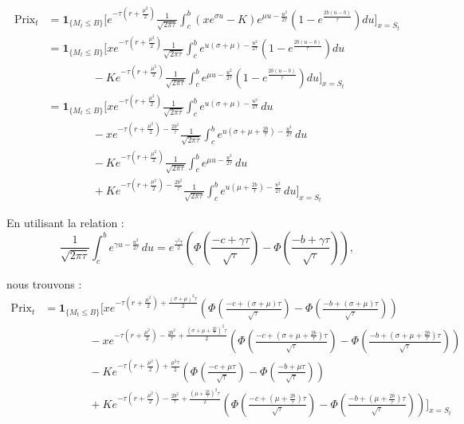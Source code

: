 \documentclass[11pt]{article}
\begin{document}
\begin{align*}
\text{Prix}_t &= \mathbf{1}_{\{M_t \le B\}} \Bigg[ e^{-\tau(r+\frac{\mu^2}{2})} \frac{1}{\sqrt{2\pi\tau}} \int_c^b (x e^{\sigma u} - K) e^{\mu u - \frac{u^2}{2\tau}} \left(1 - e^{\frac{2b(u-b)}{\tau}}\right) du \Bigg]_{x=S_t} \\
&= \mathbf{1}_{\{M_t \le B\}} \Bigg[ x e^{-\tau(r+\frac{\mu^2}{2})} \frac{1}{\sqrt{2\pi\tau}} \int_c^b e^{u(\sigma+\mu) - \frac{u^2}{2\tau}} \left(1 - e^{\frac{2b(u-b)}{\tau}}\right) du \\
&\qquad \qquad - K e^{-\tau(r+\frac{\mu^2}{2})} \frac{1}{\sqrt{2\pi\tau}} \int_c^b e^{\mu u - \frac{u^2}{2\tau}} \left(1 - e^{\frac{2b(u-b)}{\tau}}\right) du \Bigg]_{x=S_t} \\
&= \mathbf{1}_{\{M_t \le B\}} \Bigg[ x e^{-\tau(r+\frac{\mu^2}{2})} \frac{1}{\sqrt{2\pi\tau}} \int_c^b e^{u(\sigma+\mu) - \frac{u^2}{2\tau}} \, du \\
&\qquad \qquad - x e^{-\tau(r+\frac{\mu^2}{2}) - \frac{2b^2}{\tau}} \frac{1}{\sqrt{2\pi\tau}} \int_c^b e^{u(\sigma+\mu+\frac{2b}{\tau}) - \frac{u^2}{2\tau}} \, du \\
&\qquad \qquad - K e^{-\tau(r+\frac{\mu^2}{2})} \frac{1}{\sqrt{2\pi\tau}} \int_c^b e^{\mu u - \frac{u^2}{2\tau}} \, du \\
&\qquad \qquad + K e^{-\tau(r+\frac{\mu^2}{2}) - \frac{2b^2}{\tau}} \frac{1}{\sqrt{2\pi\tau}} \int_c^b e^{u(\mu+\frac{2b}{\tau}) - \frac{u^2}{2\tau}} \, du \Bigg]_{x=S_t}
\end{align*}

En utilisant la relation :
\begin{equation}
\frac{1}{\sqrt{2\pi\tau}} \int_c^b e^{\gamma u - \frac{u^2}{2\tau}} \, du = e^{\frac{\gamma^2\tau}{2}} \left( \Phi\left(\frac{-c + \gamma\tau}{\sqrt{\tau}}\right) - \Phi\left(\frac{-b + \gamma\tau}{\sqrt{\tau}}\right) \right),
\end{equation}

nous trouvons :
\begin{align*}
\text{Prix}_t &= \mathbf{1}_{\{M_t \le B\}} \Bigg[ x e^{-\tau(r+\frac{\mu^2}{2}) + \frac{(\sigma+\mu)^2\tau}{2}} \left( \Phi\left(\frac{-c + (\sigma+\mu)\tau}{\sqrt{\tau}}\right) - \Phi\left(\frac{-b + (\sigma+\mu)\tau}{\sqrt{\tau}}\right) \right) \\
&\qquad \qquad - x e^{-\tau(r+\frac{\mu^2}{2}) - \frac{2b^2}{\tau} + \frac{(\sigma+\mu+\frac{2b}{\tau})^2\tau}{2}} \left( \Phi\left(\frac{-c + (\sigma+\mu+\frac{2b}{\tau})\tau}{\sqrt{\tau}}\right) - \Phi\left(\frac{-b + (\sigma+\mu+\frac{2b}{\tau})\tau}{\sqrt{\tau}}\right) \right) \\
&\qquad \qquad - K e^{-\tau(r+\frac{\mu^2}{2}) + \frac{\mu^2\tau}{2}} \left( \Phi\left(\frac{-c + \mu\tau}{\sqrt{\tau}}\right) - \Phi\left(\frac{-b + \mu\tau}{\sqrt{\tau}}\right) \right) \\
&\qquad \qquad + K e^{-\tau(r+\frac{\mu^2}{2}) - \frac{2b^2}{\tau} + \frac{(\mu+\frac{2b}{\tau})^2\tau}{2}} \left( \Phi\left(\frac{-c + (\mu+\frac{2b}{\tau})\tau}{\sqrt{\tau}}\right) - \Phi\left(\frac{-b + (\mu+\frac{2b}{\tau})\tau}{\sqrt{\tau}}\right) \right) \Bigg]_{x=S_t}
\end{align*}
\end{document}
